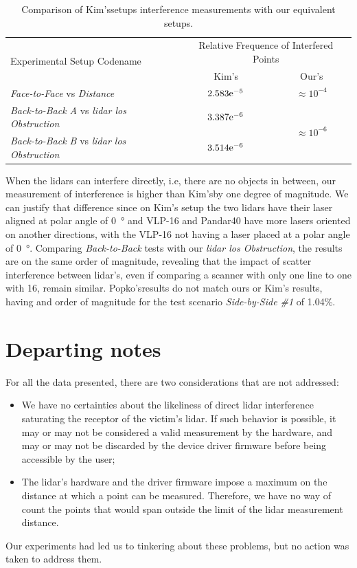 \begin{table}[!ht]
	\vspace{6mm}
	\centering
	\renewcommand{\arraystretch}{1.3}
	\begin{tabular}{@{}p{7.5cm}cc@{}}
			\toprule
			\multirow{2}{*}{Experimental Setup Codename} & \multicolumn{2}{c}{Relative Frequence of Interfered Points} \\ \cmidrule{2-3}
																									 & Kim's\etal & Our's\\
			\midrule
			\textit{Face-to-Face} vs \textit{Distance}   & $2.583\mathrm{e}^{-5}$  & $\approx 10^{-4}$ \\ \midrule
			\textit{Back-to-Back A} vs \textit{\ac{lidar} \ac{los} Obstruction}  & $3.387\mathrm{e}^{-6}$ & \multirow{2}{*}{$\approx 10^{-6}$} \\
			\textit{Back-to-Back B} vs \textit{\ac{lidar} \ac{los} Obstruction} & $3.514\mathrm{e}^{-6}$ & \\ \bottomrule
		\end{tabular}
		\caption[Comparison of Kim's\etal interferference with our results for equivalent setups.]{Comparison of Kim's\etal setups interference measurements with our equivalent setups.}
		\label{tab:kim-vs-ours-comparison}
\end{table}

When the \acp{lidar} can interfere directly, i.e, there are no objects in between, our measurement of interference is higher than Kim's\etal by one degree of magnitude. We can justify that difference since on Kim's setup the two \acp{lidar} have their laser aligned at polar angle of \SI{0}{\degree} and VLP-16 and Pandar40 have more lasers oriented on another directions, with the VLP-16 not having a laser placed at a polar angle of \SI{0}{\degree}. Comparing \textit{Back-to-Back} tests with our \textit{\ac{lidar} \ac{los} Obstruction}, the results are on the same order of magnitude, revealing that the impact of scatter interference between \ac{lidar}'s, even if comparing a scanner with only one line to one with 16, remain similar. Popko's\etal results do not match ours or Kim's results, having and order of magnitude for the test scenario \textit{Side-by-Side \#1} of 1.04\%.

\section{Departing notes}
For all the data presented, there are two considerations that are not addressed:

\begin{itemize}
	\item We have no certainties about the likeliness of direct \ac{lidar} interference saturating the receptor of the victim's \ac{lidar}. If such behavior is possible, it may or may not be considered a valid measurement by the hardware, and may or may not be discarded by the device driver firmware before being accessible by the user;
	\item The \ac{lidar}'s hardware and the driver firmware impose a maximum on the distance at which a point can be measured. Therefore, we have no way of count the points that would span outside the limit of the \ac{lidar} measurement distance. 
\end{itemize}

Our experiments had led us to tinkering about these problems, but no action was taken to address them.
